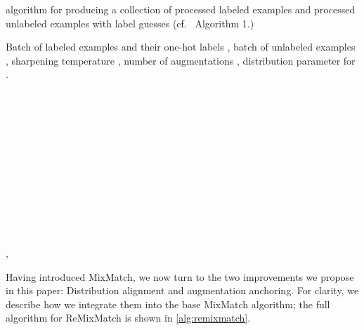 \documentclass{article} \usepackage{iclr2020_conference,times}
\begin{document}
\begin{algorithm*}[t]
        \caption{ algorithm for producing a collection of processed labeled examples and processed unlabeled examples with label guesses (cf.\ \cite{berthelot2019mixmatch} Algorithm 1.)}
   \label{alg:remixmatch}
\begin{algorithmic}[1]
   \footnotesize
    Batch of labeled examples and their one-hot labels , batch of unlabeled examples , sharpening temperature , number of augmentations ,  distribution parameter  for .
   \FOR{ \TO }
   \STATE  {} \\
   \STATE  {} \\
   \STATE  {} \\
   \STATE  {} \\
   \STATE  {} \\
   \STATE  {} \label{line:sharpen} \\
   \ENDFOR
   \STATE  {} \label{line:hat_x} \\
   \STATE  {} \\
   \STATE  {} \label{line:hat_u} \\
   \STATE  {} \label{line:tilde_u} \\
   \STATE  {} \label{line:w} \\
   \STATE  {} \label{line:x_prime} \\
   \STATE  {} \label{line:u_prime} \\
\RETURN , 
\end{algorithmic}
\end{algorithm*}

Having introduced MixMatch, we now turn to the two improvements we propose in this paper: Distribution alignment and augmentation anchoring.
For clarity, we describe how we integrate them into the base MixMatch algorithm; the full algorithm for ReMixMatch is shown in \cref{alg:remixmatch}.
\end{document}
